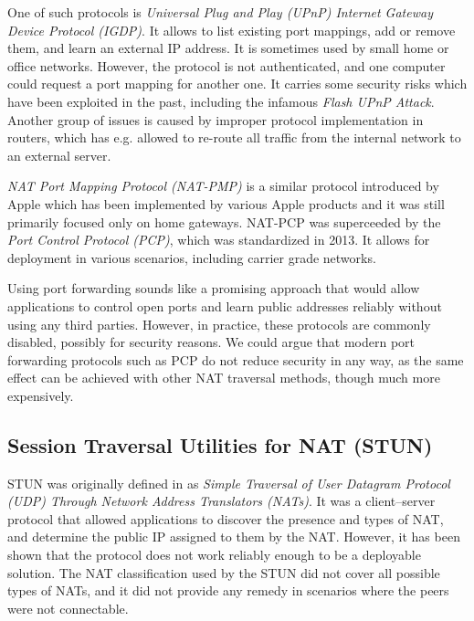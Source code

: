 One of such protocols is \textit{Universal Plug and Play (UPnP) Internet Gateway Device Protocol (IGDP)}. It allows to list existing port mappings, add or remove them, and learn an external IP address. It is sometimes used by small home or office networks. However, the protocol is not authenticated, and one computer could request a port mapping for another one. It carries some security risks which have been exploited in the past, including the infamous \textit{Flash UPnP Attack}. Another group of issues is caused by improper protocol implementation in routers, which has e.g. allowed to re-route all traffic from the internal network to an external server. \cite{upnpbugs}

\textit{NAT Port Mapping Protocol (NAT-PMP)} is a similar protocol introduced by Apple which has been implemented by various Apple products and it was still primarily focused only on home gateways. NAT-PCP was superceeded by the \textit{Port Control Protocol (PCP)}, which was standardized in 2013. \cite{pcp} It allows for deployment in various scenarios, including carrier grade networks.

Using port forwarding sounds like a promising approach that would allow applications to control open ports and learn public addresses reliably without using any third parties. However, in practice, these protocols are commonly disabled, possibly for security reasons. We could argue that modern port forwarding protocols such as PCP do not reduce security in any way, as the same effect can be achieved with other NAT traversal methods, though much more expensively.



\subsection{Session Traversal Utilities for NAT (STUN)}

STUN was originally defined in \cite{rfc3489} as \textit{Simple Traversal of User Datagram Protocol (UDP) Through Network Address Translators (NATs)}. It was a client–server protocol that allowed applications to discover the presence and types of NAT, and determine the public IP assigned to them by the NAT. However, it has been shown that the protocol does not work reliably enough to be a deployable solution. The NAT classification used by the STUN did not cover all possible types of NATs, and it did not provide any remedy in scenarios where the peers were not connectable.

